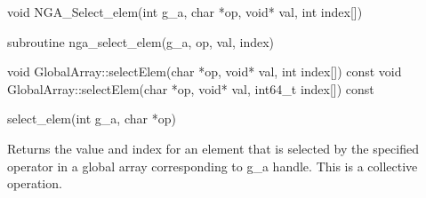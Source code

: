 \documentclass[12pt]{article}
\begin{document}

\begin{capi}
\begin{ccode}

void NGA_Select_elem(int g_a, char *op, void* val, int index[])
\end{ccode}
\begin{funcargs}
\end{funcargs}
\end{capi}

\begin{fapi}
\begin{fcode}
subroutine nga_select_elem(g_a, op, val, index)
\end{fcode}
\begin{funcargs}
\end{funcargs}
\end{fapi}

\begin{cxxapi}
\begin{cxxcode}
void GlobalArray::selectElem(char *op, void* val, int index[]) const
void GlobalArray::selectElem(char *op, void* val, int64_t index[]) const
\end{cxxcode}
\begin{funcargs}
\end{funcargs}
\end{cxxapi}


\begin{pyapi}
\begin{pycode}
select_elem(int g_a, char *op)  
\end{pycode}
\end{pyapi} 


\begin{desc}

Returns the value and index for an element that is selected by the 
specified operator in a global array corresponding to g_a handle.
This is a collective operation.
\end{desc}
\end{document}
